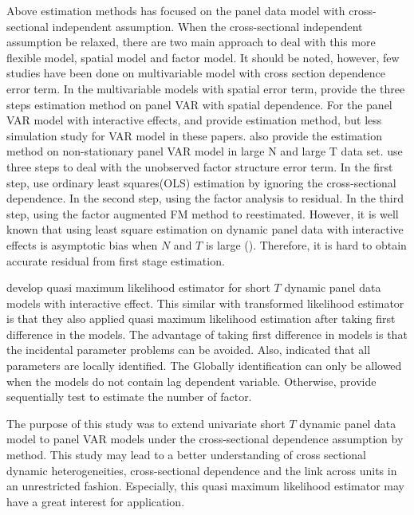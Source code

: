 \documentclass[12pt,a4paper,hyperref]{article}
\begin{document}
Above estimation methods has focused on the panel data model with cross-sectional independent assumption. When the cross-sectional independent assumption be relaxed, there are two main approach to deal with this more flexible model, spatial model and factor model. It should be noted, however, few studies have been done on multivariable model with cross section dependence error term. In the multivariable models with spatial error term, \citet{Mutl:2009} provide the three steps estimation method on panel VAR with spatial dependence. For the panel VAR model with interactive effects, \citet{Bai:2013} and \citet{Moon:2017} provide estimation method, but less simulation study for VAR model in these papers. \citet{Huang:2008} also provide the estimation method on non-stationary panel VAR model in large N and large T data set. \citet{Huang:2008} use three steps to deal with the unobserved factor structure error term. In the first step, \citet{Huang:2008} use ordinary least squares(OLS) estimation by ignoring the cross-sectional dependence. In the second step, using the factor analysis to residual. In the third step, using the factor augmented FM method to reestimated. However, it is well known that using least square estimation on dynamic panel data with interactive effects is asymptotic bias when $N$ and $T$ is large (\citet{Moon:2017}). Therefore, it is hard to obtain accurate residual from first stage estimation.



\citet{Hayakawa:2018} develop quasi maximum likelihood estimator for short $T$ dynamic panel data models with interactive effect. This similar with \citet{Hsiao:2002} transformed likelihood estimator is that they also applied quasi maximum likelihood estimation after taking first difference in the models. The advantage of taking first difference in models is that the incidental parameter problems can be avoided. Also, \citet{Hayakawa:2018} indicated that all parameters are locally identified. The Globally identification can only be allowed when the models do not contain lag dependent variable. Otherwise, \citet{Hayakawa:2018} provide sequentially test to estimate the number of factor.

The purpose of this study was to extend univariate short $T$ dynamic panel data model to panel VAR models under the cross-sectional dependence assumption by \citet{Hayakawa:2018} method. This study may lead to a better understanding of cross sectional dynamic heterogeneities, cross-sectional dependence and the link across units in an unrestricted fashion. Especially, this quasi maximum likelihood estimator may have a great interest for application.
\end{document}
